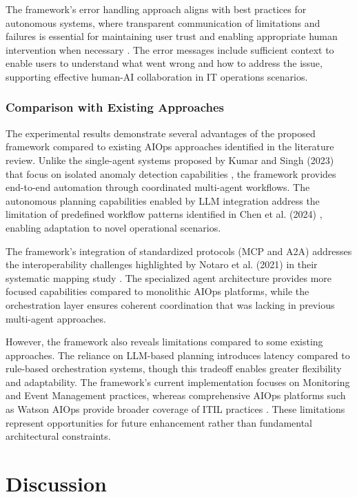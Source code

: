 \documentclass{article}
\begin{document}
The framework's error handling approach aligns with best practices for autonomous systems, where transparent communication of limitations and failures is essential for maintaining user trust and enabling appropriate human intervention when necessary \cite{johnson2024}. The error messages include sufficient context to enable users to understand what went wrong and how to address the issue, supporting effective human-AI collaboration in IT operations scenarios.

\subsubsection{Comparison with Existing Approaches}

The experimental results demonstrate several advantages of the proposed framework compared to existing AIOps approaches identified in the literature review. Unlike the single-agent systems proposed by Kumar and Singh (2023) that focus on isolated anomaly detection capabilities \cite{kumar2023}, the framework provides end-to-end automation through coordinated multi-agent workflows. The autonomous planning capabilities enabled by LLM integration address the limitation of predefined workflow patterns identified in Chen et al. (2024) \cite{chen2024}, enabling adaptation to novel operational scenarios.

The framework's integration of standardized protocols (MCP and A2A) addresses the interoperability challenges highlighted by Notaro et al. (2021) in their systematic mapping study \cite{notaro2021}. The specialized agent architecture provides more focused capabilities compared to monolithic AIOps platforms, while the orchestration layer ensures coherent coordination that was lacking in previous multi-agent approaches.

However, the framework also reveals limitations compared to some existing approaches. The reliance on LLM-based planning introduces latency compared to rule-based orchestration systems, though this tradeoff enables greater flexibility and adaptability. The framework's current implementation focuses on Monitoring and Event Management practices, whereas comprehensive AIOps platforms such as Watson AIOps provide broader coverage of ITIL practices \cite{onkamo2023}. These limitations represent opportunities for future enhancement rather than fundamental architectural constraints.

\section{Discussion}
\end{document}
